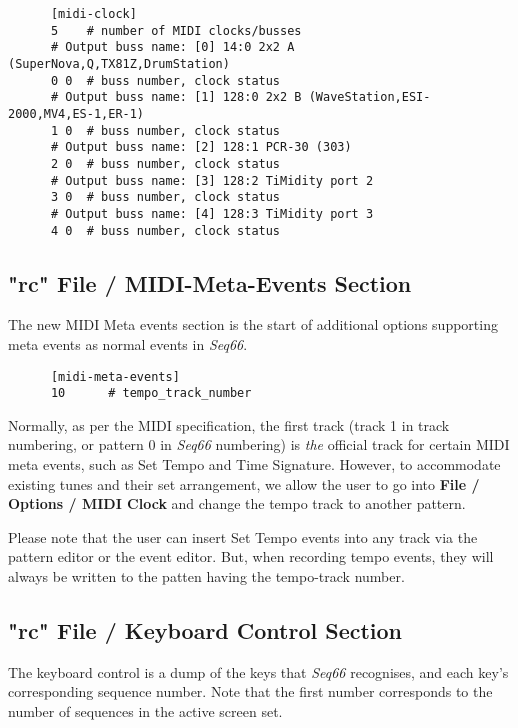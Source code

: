    \begin{verbatim}
      [midi-clock]
      5    # number of MIDI clocks/busses
      # Output buss name: [0] 14:0 2x2 A (SuperNova,Q,TX81Z,DrumStation)
      0 0  # buss number, clock status
      # Output buss name: [1] 128:0 2x2 B (WaveStation,ESI-2000,MV4,ES-1,ER-1)
      1 0  # buss number, clock status
      # Output buss name: [2] 128:1 PCR-30 (303)
      2 0  # buss number, clock status
      # Output buss name: [3] 128:2 TiMidity port 2
      3 0  # buss number, clock status
      # Output buss name: [4] 128:3 TiMidity port 3
      4 0  # buss number, clock status
   \end{verbatim}

\subsection{"rc" File / MIDI-Meta-Events Section}
\label{subsec:seq66_rc_file_midi_meta_events}

   The new MIDI Meta events section is the start of additional options
   supporting meta events as normal events in \textsl{Seq66}.

   \begin{verbatim}
      [midi-meta-events]
      10      # tempo_track_number
   \end{verbatim}

   Normally, as per the MIDI specification, the first track (track 1 in track
   numbering, or pattern 0 in \textsl{Seq66} numbering) is \textsl{the}
   official track for certain MIDI meta events, such as Set Tempo and Time
   Signature.  However, to accommodate existing tunes and their set
   arrangement, we allow the user to go into \textbf{File / Options / MIDI
   Clock} and change the tempo track to another pattern.

   Please note that the user can insert Set Tempo events into any track via the
   pattern editor or the event editor.  But, when recording tempo events, they
   will always be written to the patten having the tempo-track number.

\subsection{"rc" File / Keyboard Control Section}
\label{subsec:seq66_rc_file_keyboard_control}
        
   The keyboard control is a dump of the keys that \textsl{Seq66}
   recognises, and each key's corresponding sequence number.
   Note that the first number corresponds to the number of sequences in
   the active screen set.

